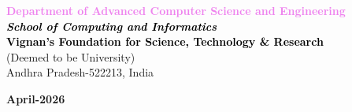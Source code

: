 \begin{center}
\vspace{3mm}

\large { 
\textbf{ \textcolor{violet}{Department of Advanced Computer Science and Engineering}\\
\textcolor{black}{\textit{School of Computing and Informatics}}}\\
\textbf{\textcolor{black}{Vignan’s Foundation for Science, Technology \& Research}}} \\

(Deemed to be University) \\
Andhra Pradesh-522213, India \\

\vspace{3mm}

\textbf{April-2026}

\end{center}

\thispagestyle{empty}